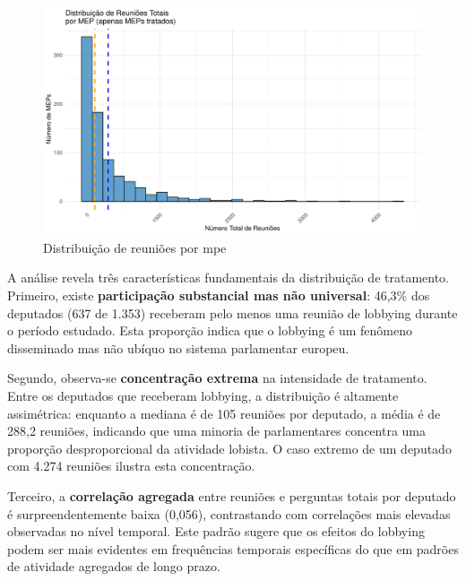 \begin{figure}[htbp]
    \centering
    \includegraphics[width=\textwidth]{figures/fig3.1_meetings_hist.pdf}
    \caption{Distribuição de reuniões por \acrshort{mpe}}
    \label{fig:meetings_hist}
\end{figure}


A análise revela três características fundamentais da distribuição de tratamento. Primeiro, existe \textbf{participação substancial mas não universal}: 46,3\% dos deputados (637 de 1.353) receberam pelo menos uma reunião de lobbying durante o período estudado. Esta proporção indica que o lobbying é um fenômeno disseminado mas não ubíquo no sistema parlamentar europeu.

Segundo, observa-se \textbf{concentração extrema} na intensidade de tratamento. Entre os deputados que receberam lobbying, a distribuição é altamente assimétrica: enquanto a mediana é de 105 reuniões por deputado, a média é de 288,2 reuniões, indicando que uma minoria de parlamentares concentra uma proporção desproporcional da atividade lobista. O caso extremo de um deputado com 4.274 reuniões ilustra esta concentração.

Terceiro, a \textbf{correlação agregada} entre reuniões e perguntas totais por deputado é surpreendentemente baixa (0,056), contrastando com correlações mais elevadas observadas no nível temporal. Este padrão sugere que os efeitos do lobbying podem ser mais evidentes em frequências temporais específicas do que em padrões de atividade agregados de longo prazo.

